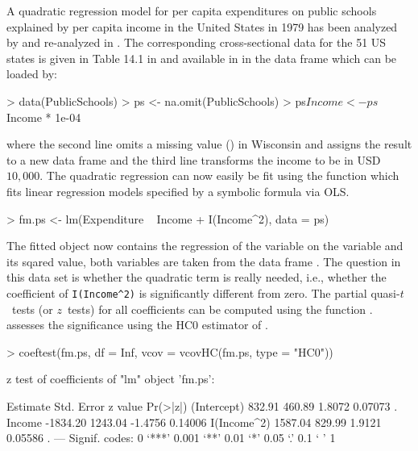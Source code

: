 \documentclass{Z}
\begin{document}
A quadratic regression model for per capita expenditures on public schools
explained by per capita income in the United States in 1979
has been analyzed by \cite{hac:Greene:1993} and re-analyzed in
\cite{hac:Cribari-Neto:2004}. The corresponding cross-sectional
data for the 51 US states
is given in Table 14.1 in \cite{hac:Greene:1993} and available in
 in the data frame  which can be
loaded by:
\begin{Schunk}
\begin{Sinput}
> data(PublicSchools)
> ps <- na.omit(PublicSchools)
> ps$Income <- ps$Income * 1e-04
\end{Sinput}
\end{Schunk}
where the second line omits a missing value () in Wisconsin
and assigns the result to a new data frame  and
the third line transforms the income to be in USD $10,000$.
The quadratic regression can now easily be fit using the function
 which fits linear regression models specified by
a symbolic formula via OLS.
\begin{Schunk}
\begin{Sinput}
> fm.ps <- lm(Expenditure ~ Income + I(Income^2), data = ps)
\end{Sinput}
\end{Schunk}
The fitted  object  now contains the regression of
the variable  on the variable 
and its sqared value, both variables are taken from the data frame .
The question in this data set is whether the quadratic term is really 
needed, i.e., whether the coefficient of \verb/I(Income^2)/ is significantly
different from zero. The partial quasi-$t$~tests (or $z$~tests) for all
coefficients can be computed using the function . \cite{hac:Greene:1993}
assesses the significance using the HC0 estimator of \cite{hac:White:1980}.
\begin{Schunk}
\begin{Sinput}
> coeftest(fm.ps, df = Inf, vcov = vcovHC(fm.ps, type = "HC0"))
\end{Sinput}
\begin{Soutput}
z test of coefficients of "lm" object 'fm.ps':

            Estimate Std. Error z value Pr(>|z|)  
(Intercept)   832.91     460.89  1.8072  0.07073 .
Income      -1834.20    1243.04 -1.4756  0.14006  
I(Income^2)  1587.04     829.99  1.9121  0.05586 .
---
Signif. codes:  0 `***' 0.001 `**' 0.01 `*' 0.05 `.' 0.1 ` ' 1 
\end{Soutput}
\end{Schunk}
\end{document}
